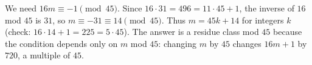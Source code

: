 We need $16m\equiv-1\pmod{45}$. Since $16\cdot31=496=11\cdot45+1$, the inverse of $16$ mod $45$ is $31$, so $m\equiv-31\equiv14\pmod{45}$. Thus $\boxed{m=45k+14}$ for integers $k$ (check: $16\cdot14+1=225=5\cdot45$). The answer is a residue class mod $45$ because the condition depends only on $m$ mod $45$: changing $m$ by $45$ changes $16m+1$ by $720$, a multiple of $45$.
